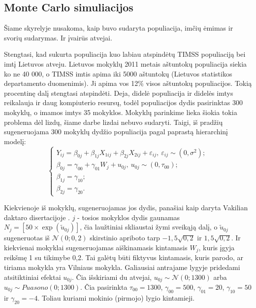 \documentclass[12pt,a4paper]{article}
\begin{document}
\subsection{Monte Carlo simuliacijos}
\indent Šiame skyrelyje nusakoma, kaip buvo sudaryta populiacija, imčių ėmimas ir svorių sudarymas. Ir įvairūs atvejai.

\indent Stengtasi, kad sukurta populiacija kuo labiau atspindėtų TIMSS populiaciją bei imtį Lietuvos atveju. Lietuvos mokyklų 2011 metais aštuntokų populiacija siekia ko ne 40 000, o TIMSS imtis apima iki 5000 aštuntokų (Lietuvos statistikos departamento duomenimis). Ji apima vos 12\% visos aštuntokų populiacijos. Tokią procentinę dalį stengtasi atspindėti. Deja, didelė populiacija ir didelės imtys reikalauja ir daug kompiuterio resursų, todėl populiacijos dydis pasirinktas 300 mokyklų, o imamos imtys 35 mokyklos. Mokyklų parinkime lieka šiokia tokia problema dėl lizdų, šiame darbe lizdai nebuvo sudaryti. Taigi, iš pradžių sugeneruojama 300 mokyklų dydžio populiacija pagal paprastą hierarchinį modelį:
\begin{equation}\label{eq:simul}
\left\{
\begin{array}{l}
Y_{ij}=\beta_{0j}+\beta_{1j}X_{1ij}+\beta_{2j}X_{2ij}+\varepsilon_{ij}, \ \varepsilon_{ij}\sim (0, \sigma^2);\\
\beta_{0j}=\gamma_{00}+\gamma_{01}W_j+u_{0j}, \ u_{0j}\sim (0, \tau_{00});\\
\beta_{1j}=\gamma_{10};\\
\beta_{2j}=\gamma_{20}.
\end{array} \right.
\end{equation}

\indent Kiekvienoje iš mokyklų, sugeneruojamas jos dydis, panašiai kaip daryta Vakilian daktaro disertacijoje \cite{mcmc}. $j$ - tosios mokyklos dydis gaunamas $N_j=\left[50\times\exp{(\tilde{u}_{0j})}\right]$, čia laužtiniai skliaustai žymi sveikąją dalį, o $\tilde{u}_{0j}$ sugeneruotas iš $\mathcal{N}(0; 0,2)$ skirstinio apriboto tarp $-1,5\sqrt{0,2}$ ir $1,5\sqrt{0,2}$. Ir kiekvienai mokyklai sugeneruojamas aiškinamasis kintamasis $W_j$, kuris įgyja reikšmę 1 su tikimybe 0,2. Tai galėtų būti fiktyvus kintamasis, kuris parodo, ar tiriama mokykla yra Vilniaus mokykla. Galiausiai antrajame lygyje pridedami atsitiktiniai efektai $u_{0j}$. Čia išskiriami du atvejai, $u_{0j}\sim \mathcal{N}(0; 1300)$ arba $u_{0j}\sim Puasono(0; 1300)$. Čia pasirinkta $\tau_{00}=1300$, $\gamma_{00}=500$, $\gamma_{01}=20$, $\gamma_{10}=50$ ir $\gamma_{20}=-4$. Toliau kuriami mokinio (pirmojo) lygio kintamieji.
\end{document}
